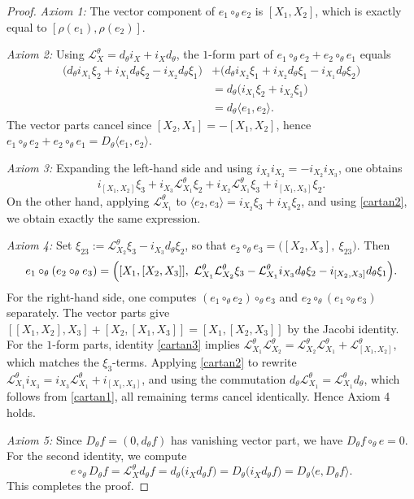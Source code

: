 \documentclass[11pt,a4paper]{article}
\theoremstyle{plain}
\theoremstyle{definition}
\theoremstyle{remark}
\begin{document}
\begin{proof}
\textit{Axiom 1:} The vector component of $e_1\circ_\theta e_2$ is $[X_1,X_2]$, which is exactly equal to $[\rho(e_1),\rho(e_2)]$.

\smallskip
\textit{Axiom 2:} Using $\mathcal{L}^\theta_X = d_{\theta} i_X + i_X d_{\theta}$, the $1$-form part of
$e_1\circ_\theta e_2 + e_2\circ_\theta e_1$ equals
\begin{align*}
	\bigl(d_{\theta} i_{X_1}\xi_2 + i_{X_1}d_{\theta}\xi_2 - i_{X_2}d_{\theta}\xi_1\bigr)
	&+ \bigl(d_{\theta} i_{X_2}\xi_1 + i_{X_2}d_{\theta}\xi_1 - i_{X_1}d_{\theta}\xi_2\bigr)\\
	&= d_{\theta}\bigl(i_{X_1}\xi_2 + i_{X_2}\xi_1\bigr)\\
	&= d_{\theta}\langle e_1,e_2\rangle.
\end{align*}
The vector parts cancel since $[X_2,X_1]=-[X_1,X_2]$, hence
$e_1\circ_\theta e_2 + e_2\circ_\theta e_1 = D_\theta\langle e_1,e_2\rangle$.

\smallskip
\textit{Axiom 3:} Expanding the left-hand side and using $i_{X_3}i_{X_2}=-i_{X_2}i_{X_3}$, one obtains
$$
i_{[X_1,X_2]}\xi_3 + i_{X_3}\mathcal{L}^\theta_{X_1}\xi_2
+ i_{X_2}\mathcal{L}^\theta_{X_1}\xi_3 + i_{[X_1,X_3]}\xi_2.
$$
On the other hand, applying $\mathcal{L}^\theta_{X_1}$ to
$\langle e_2,e_3\rangle = i_{X_2}\xi_3 + i_{X_3}\xi_2$, and using \eqref{cartan2},
we obtain exactly the same expression.

\smallskip
\textit{Axiom 4:} Set $\xi_{23}:=\mathcal{L}^\theta_{X_2}\xi_3 - i_{X_3}d_{\theta}\xi_2$, so that
$e_2\circ_\theta e_3 = \bigl([X_2,X_3],\ \xi_{23}\bigr)$.
Then
\begin{equation*}
	e_1\circ_\theta (e_2\circ_\theta e_3)
	=
	\Bigl([X_1,[X_2,X_3]],\ \mathcal{L}^\theta_{X_1}\mathcal{L}^\theta_{X_2}\xi_3
	- \mathcal{L}^\theta_{X_1}i_{X_3}d_{\theta}\xi_2
	- i_{[X_2,X_3]}d_{\theta}\xi_1\Bigr).
\end{equation*}
For the right-hand side, one computes $(e_1\circ_\theta e_2)\circ_\theta e_3$ and
$e_2\circ_\theta (e_1\circ_\theta e_3)$ separately.
The vector parts give
$[[X_1,X_2],X_3] + [X_2,[X_1,X_3]] = [X_1,[X_2,X_3]]$ by the Jacobi identity.
For the $1$-form parts, identity \eqref{cartan3} implies
$\mathcal{L}^\theta_{X_1}\mathcal{L}^\theta_{X_2}
= \mathcal{L}^\theta_{X_2}\mathcal{L}^\theta_{X_1}+\mathcal{L}^\theta_{[X_1,X_2]}$,
which matches the $\xi_3$-terms.
Applying \eqref{cartan2} to rewrite
$\mathcal{L}^\theta_{X_1}i_{X_3}
= i_{X_3}\mathcal{L}^\theta_{X_1}+i_{[X_1,X_3]}$,
and using the commutation $d_{\theta}\mathcal{L}^\theta_{X_1}=\mathcal{L}^\theta_{X_1}d_{\theta}$,
which follows from \eqref{cartan1},
all remaining terms cancel identically.
Hence Axiom 4 holds.

\smallskip
\textit{Axiom 5:} Since $D_\theta f=(0,d_{\theta} f)$ has vanishing vector part, we have
$D_\theta f\circ_\theta e=0$.
For the second identity, we compute
$$
e\circ_\theta D_\theta f
= \mathcal{L}^\theta_X d_{\theta} f
= d_{\theta}\bigl(i_X d_{\theta} f\bigr)
= D_\theta\bigl(i_X d_{\theta} f\bigr)
= D_\theta\langle e,D_\theta f\rangle.
$$
This completes the proof.
\end{proof}
\end{document}
